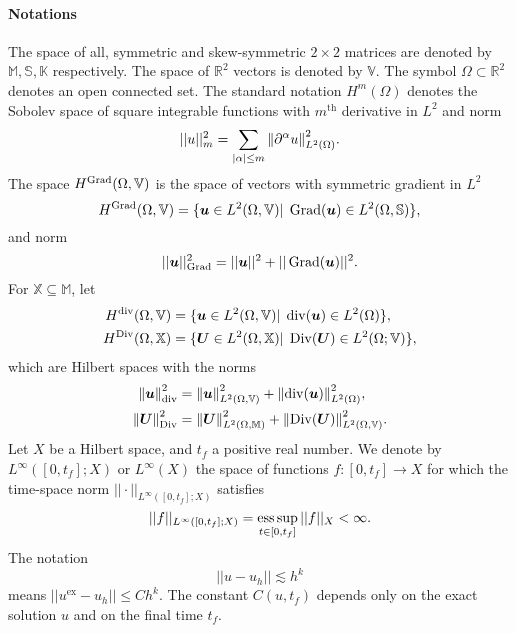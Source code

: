 \paragraph{Notations}
The space of all, symmetric and skew-symmetric $2\times 2$ matrices are denoted by $\mathbb{M}, \mathbb{S}, \mathbb{K}$ respectively. The space of $\mathbb{R}^2$ vectors is denoted by $\mathbb{V}$. The symbol $\Omega \subset \mathbb{R}^2$ denotes an open connected set. The standard notation $H^m(\Omega)$ denotes the Sobolev space of square integrable functions with  $m^\text{th}$ derivative in $L^2$ and norm 
\begin{equation*}
||u||_m^2 = {\sum_{|\alpha|\le m} \left\|\partial^\alpha u\right\|_{L^2(\Omega)}^2}.
\end{equation*}
The space $H^{\operatorname*{Grad}}(\Omega, \mathbb{V})$ is the space of vectors with symmetric gradient in $L^2$
\begin{equation*}
H^{\operatorname*{Grad}}(\Omega, \mathbb{V}) = \{\bm{u} \in L^2(\Omega, \mathbb{V}) \vert \; \operatorname*{Grad}(\bm{u}) \in L^2(\Omega, \mathbb{S}) \},
\end{equation*}
and norm 
\begin{equation*}
||\bm{u}||_{\operatorname*{Grad}}^2 = {||\bm{u}||^2 + ||\operatorname*{Grad}(\bm{u})||^2}.
\end{equation*}
For $\mathbb{X} \subseteq \mathbb{M}$, let
\begin{equation*}
\begin{aligned}
H^{\operatorname{div}}(\Omega, \mathbb{V}) &= \{\bm{u} \in L^2(\Omega, \mathbb{V}) \vert \; \operatorname{div}(\bm{u}) \in L^2(\Omega) \}, \\
H^{\operatorname*{Div}}(\Omega, \mathbb{X}) &= \{\bm{U} \in L^2(\Omega, \mathbb{X}) \vert \; \operatorname*{Div}(\bm{U}) \in L^2(\Omega; \mathbb{V}) \},
\end{aligned}
\end{equation*}
which are Hilbert spaces with the norms 
\begin{align*}
\left\|\bm{u}\right\|_{\operatorname{div}}^2 &= {\left\|\bm{u}\right\|_{L^2(\Omega, \mathbb{V})}^2 + \left\|\operatorname{div}(\bm{u})\right\|_{L^2(\Omega)}^2}, \\
\left\|\bm{U}\right\|_{\operatorname*{Div}}^2 &= {\left\|\bm{U}\right\|_{L^2(\Omega, \mathbb{M})}^2 + \left\|\operatorname*{Div}(\bm{U})\right\|_{L^2(\Omega, \mathbb{V})}^2}.
\end{align*}
Let ${X}$ be a Hilbert space, and $t_f$ a positive real number. We denote by $L^\infty([0, t_f]; {X})$ or $L^\infty({X})$ the space of functions $f: [0, t_f] \rightarrow X$ for which the time-space norm $||\cdot||_{L^\infty([0, t_f]; {X})}$ satisfies
\[
||f||_{L^\infty([0, t_f]; {X})} = \operatorname*{ess\,sup}_{t \in [0,t_f]} ||f||_{{X}} < \infty.
\]
The notation
$$||u - u_h || \lesssim  h^k$$
means $||u^\text{ex} - u_h|| \le C h^k$. The constant $C(u, t_f)$ depends only on the exact solution $u$ and on the final time $t_f$.


